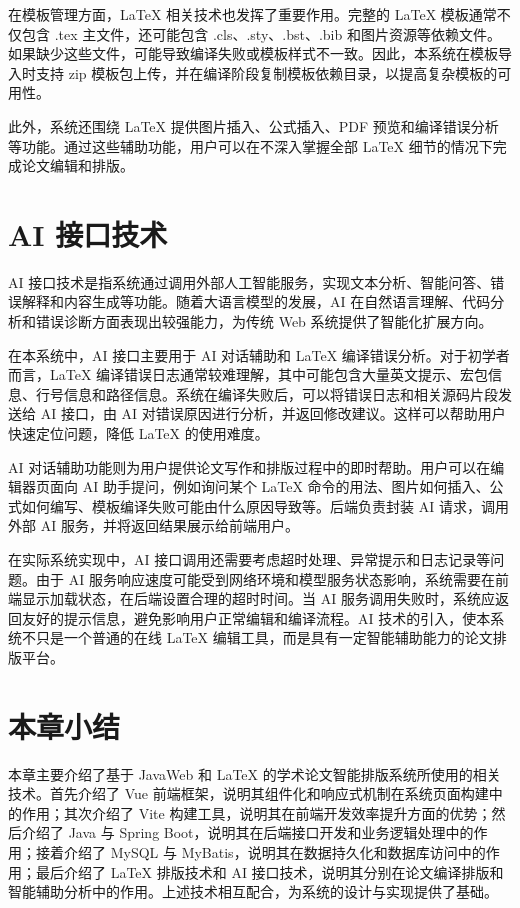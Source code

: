 \documentclass{xduugthesis}
\begin{document}
在模板管理方面，LaTeX 相关技术也发挥了重要作用。完整的 LaTeX 模板通常不仅包含 .tex 主文件，还可能包含 .cls、.sty、.bst、.bib 和图片资源等依赖文件。如果缺少这些文件，可能导致编译失败或模板样式不一致。因此，本系统在模板导入时支持 zip 模板包上传，并在编译阶段复制模板依赖目录，以提高复杂模板的可用性。

此外，系统还围绕 LaTeX 提供图片插入、公式插入、PDF 预览和编译错误分析等功能。通过这些辅助功能，用户可以在不深入掌握全部 LaTeX 细节的情况下完成论文编辑和排版。

\section{AI 接口技术}
AI 接口技术是指系统通过调用外部人工智能服务，实现文本分析、智能问答、错误解释和内容生成等功能。随着大语言模型的发展，AI 在自然语言理解、代码分析和错误诊断方面表现出较强能力，为传统 Web 系统提供了智能化扩展方向。

在本系统中，AI 接口主要用于 AI 对话辅助和 LaTeX 编译错误分析。对于初学者而言，LaTeX 编译错误日志通常较难理解，其中可能包含大量英文提示、宏包信息、行号信息和路径信息。系统在编译失败后，可以将错误日志和相关源码片段发送给 AI 接口，由 AI 对错误原因进行分析，并返回修改建议。这样可以帮助用户快速定位问题，降低 LaTeX 的使用难度。

AI 对话辅助功能则为用户提供论文写作和排版过程中的即时帮助。用户可以在编辑器页面向 AI 助手提问，例如询问某个 LaTeX 命令的用法、图片如何插入、公式如何编写、模板编译失败可能由什么原因导致等。后端负责封装 AI 请求，调用外部 AI 服务，并将返回结果展示给前端用户。

在实际系统实现中，AI 接口调用还需要考虑超时处理、异常提示和日志记录等问题。由于 AI 服务响应速度可能受到网络环境和模型服务状态影响，系统需要在前端显示加载状态，在后端设置合理的超时时间。当 AI 服务调用失败时，系统应返回友好的提示信息，避免影响用户正常编辑和编译流程。AI 技术的引入，使本系统不只是一个普通的在线 LaTeX 编辑工具，而是具有一定智能辅助能力的论文排版平台。

\section{本章小结}
本章主要介绍了基于 JavaWeb 和 LaTeX 的学术论文智能排版系统所使用的相关技术。首先介绍了 Vue 前端框架，说明其组件化和响应式机制在系统页面构建中的作用；其次介绍了 Vite 构建工具，说明其在前端开发效率提升方面的优势；然后介绍了 Java 与 Spring Boot，说明其在后端接口开发和业务逻辑处理中的作用；接着介绍了 MySQL 与 MyBatis，说明其在数据持久化和数据库访问中的作用；最后介绍了 LaTeX 排版技术和 AI 接口技术，说明其分别在论文编译排版和智能辅助分析中的作用。上述技术相互配合，为系统的设计与实现提供了基础。
\end{document}
